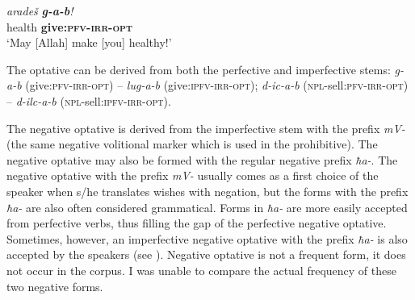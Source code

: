 ﻿\documentclass[output=paper]{langsci/langscibook}
\begin{document}
\ea %
\gll \emph{aradeš} \emph{\textbf{g-a-b}!}\\
 health \textbf{give:\textsc{pfv}-\textsc{irr}-\textsc{opt}}\\
\glt `May [Allah] make [you] healthy!'
\z

The optative can be derived from both the perfective and imperfective
stems: \emph{g-a-b} (give:\textsc{pfv}-\textsc{irr}-\textsc{opt}) – \emph{lug-a-b}
(give:\textsc{ipfv}-\textsc{irr}-\textsc{opt}); \emph{d-ic-a-b} (\textsc{npl}-sell:\textsc{pfv}-\textsc{irr}-\textsc{opt}) –
\emph{d-ilc-a-b} (\textsc{npl}-sell:\textsc{ipfv}-\textsc{irr}-\textsc{opt}).

The negative optative is derived from the imperfective stem with the
prefix \emph{mV-} (the same negative volitional marker which is used in the
prohibitive). The negative optative may also be formed with the regular
negative prefix \emph{ħa-}. The negative optative with the prefix
\emph{mV-} usually comes as a first choice of the speaker when s/he
translates wishes with negation, but the forms with the prefix
\emph{ħa-} are also often considered grammatical. Forms in \emph{ħa-}
are more easily accepted from perfective verbs, thus filling the gap of
the perfective negative optative. Sometimes, however, an imperfective
negative optative with the prefix \emph{ħa-} is also accepted by the
speakers (see ). Negative optative is not a frequent form, it
does not occur in the corpus. I was unable to compare the actual
frequency of these two negative forms.
\end{document}
